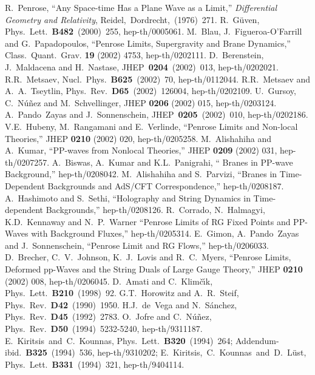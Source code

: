 \documentclass[a4paper,12pt]{article}
\begin{document}
 
\begin{thebibliography}{99}
R.~Penrose,
``Any Space-time Has a Plane Wave as a Limit,''
{\it Differential Geometry and Relativity},  
Reidel,~Dordrecht,~(1976)~271. 
R.~G\"{u}ven,
Phys.~Lett.~{\bf B482}~(2000)~255,
hep-th/0005061.
M.~Blau, J.~Figueroa-O'Farrill and G.~Papadopoulos,
``Penrose Limits, Supergravity and Brane Dynamics,''
Class.~Quant.~Grav. {\bf 19} (2002) 4753, hep-th/0202111.
D.~Berenstein, J.~Maldacena and H.~Nastase,
JHEP~{\bf 0204}~(2002)~013, hep-th/0202021.
R.R.~Metsaev,
Nucl.~Phys.~{\bf B625}~(2002)~70, 
hep-th/0112044.
R.R.~Metsaev and A.~A.~Tseytlin, 
Phys.~Rev.~{\bf D65}~(2002)~126004, hep-th/0202109.
U.~Gursoy, C.~N\'{u}\~{n}ez and M.~Schvellinger,
JHEP {\bf 0206} (2002) 015, hep-th/0203124.
A.~Pando~Zayas and J.~Sonnenschein,
JHEP~{\bf 0205}~(2002)~010, hep-th/0202186.
V.E.~Hubeny, M.~Rangamani and E.~Verlinde,
``Penrose Limits and Non-local Theories,''
JHEP {\bf 0210} (2002) 020, hep-th/0205258.
M.~Alishahiha and A.~Kumar,
``PP-waves from Nonlocal Theories,''
JHEP {\bf 0209} (2002) 031, hep-th/0207257.
A.~Biswas, A.~Kumar and K.L.~Panigrahi,
``\coordHE{} Branes in PP-wave Background,''
hep-th/0208042.
M.~Alishahiha and S.~Parvizi,
``Branes in Time-Dependent Backgrounds and AdS/CFT Correspondence,''
hep-th/0208187.
A.~Hashimoto and S.~Sethi,
``Holography and String Dynamics in Time-dependent Backgrounds,''
hep-th/0208126.
R.~Corrado, N.~Halmagyi, K.D.~Kennaway and N.~P.~Warner
``Penrose Limits of RG Fixed Points and PP-Waves with Background Fluxes,''
hep-th/0205314.
E.~Gimon, A.~Pando~Zayas and J.~Sonnenschein,
``Penrose Limit and RG Flows,''
hep-th/0206033.
D.~Brecher, C.~V.~Johnson, K.~J.~Lovis and R.~C.~Myers,
``Penrose Limits, Deformed pp-Waves and the String Duals of \coordHE{} Large \coordHE{}
	Gauge Theory,''
JHEP {\bf 0210} (2002) 008, hep-th/0206045.
D.~Amati and C.~Klim\v{c}\'{\i}k,
Phys.~Lett.~{\bf B210}~(1998)~92.
G.T.~Horowitz and A.~R.~Steif,
Phys.~Rev.~{\bf D42}~(1990)~1950.
H.J.~de~Vega and N.~S\'anchez,
Phys.~Rev.~{\bf D45}~(1992)~2783.
O.~Jofre and  C.~N\'{u}\~{n}ez,
Phys.~Rev.~{\bf  D50}~(1994)~5232-5240, hep-th/9311187.
E.~Kiritsis~and~C.~Kounnas,
Phys.~Lett.~{\bf B320}~(1994)~264; Addendum-ibid.~{\bf B325}~(1994)~536, 
hep-th/9310202;
E.~Kiritsis,~C.~Kounnas~and~D.~L\"ust,
Phys.~Lett.~{\bf B331}~(1994)~321, hep-th/9404114.


\end{thebibliography}
\end{document}
